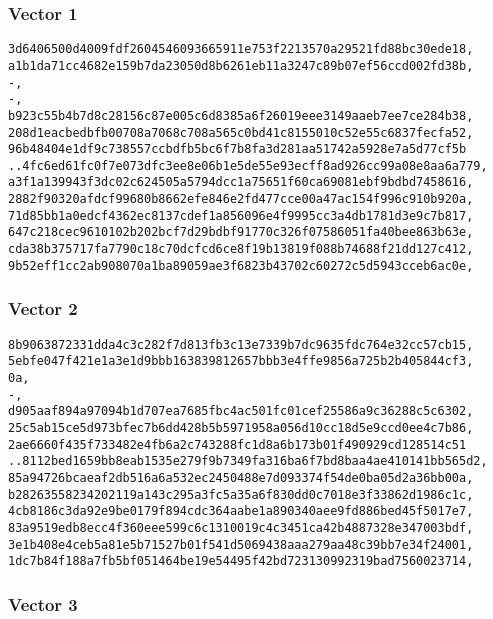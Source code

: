 \documentclass[
]{article}
\begin{document}
\hypertarget{vector-1-1}{%
\subsubsection{Vector 1}\label{vector-1-1}}

\begin{verbatim}
3d6406500d4009fdf2604546093665911e753f2213570a29521fd88bc30ede18,
a1b1da71cc4682e159b7da23050d8b6261eb11a3247c89b07ef56ccd002fd38b,
-,
-,
b923c55b4b7d8c28156c87e005c6d8385a6f26019eee3149aaeb7ee7ce284b38,
208d1eacbedbfb00708a7068c708a565c0bd41c8155010c52e55c6837fecfa52,
96b48404e1df9c738557ccbdfb5bc6f7b8fa3d281aa51742a5928e7a5d77cf5b
..4fc6ed61fc0f7e073dfc3ee8e06b1e5de55e93ecff8ad926cc99a08e8aa6a779,
a3f1a139943f3dc02c624505a5794dcc1a75651f60ca69081ebf9bdbd7458616,
2882f90320afdcf99680b8662efe846e2fd477cce00a47ac154f996c910b920a,
71d85bb1a0edcf4362ec8137cdef1a856096e4f9995cc3a4db1781d3e9c7b817,
647c218cec9610102b202bcf7d29bdbf91770c326f07586051fa40bee863b63e,
cda38b375717fa7790c18c70dcfcd6ce8f19b13819f088b74688f21dd127c412,
9b52eff1cc2ab908070a1ba89059ae3f6823b43702c60272c5d5943cceb6ac0e,
\end{verbatim}

\hypertarget{vector-2-1}{%
\subsubsection{Vector 2}\label{vector-2-1}}

\begin{verbatim}
8b9063872331dda4c3c282f7d813fb3c13e7339b7dc9635fdc764e32cc57cb15,
5ebfe047f421e1a3e1d9bbb163839812657bbb3e4ffe9856a725b2b405844cf3,
0a,
-,
d905aaf894a97094b1d707ea7685fbc4ac501fc01cef25586a9c36288c5c6302,
25c5ab15ce5d973bfec7b6dd428b5b5971958a056d10cc18d5e9ccd0ee4c7b86,
2ae6660f435f733482e4fb6a2c743288fc1d8a6b173b01f490929cd128514c51
..8112bed1659bb8eab1535e279f9b7349fa316ba6f7bd8baa4ae410141bb565d2,
85a94726bcaeaf2db516a6a532ec2450488e7d093374f54de0ba05d2a36bb00a,
b28263558234202119a143c295a3fc5a35a6f830dd0c7018e3f33862d1986c1c,
4cb8186c3da92e9be0179f894cdc364aabe1a890340aee9fd886bed45f5017e7,
83a9519edb8ecc4f360eee599c6c1310019c4c3451ca42b4887328e347003bdf,
3e1b408e4ceb5a81e5b71527b01f541d5069438aaa279aa48c39bb7e34f24001,
1dc7b84f188a7fb5bf051464be19e54495f42bd723130992319bad7560023714,
\end{verbatim}

\hypertarget{vector-3-1}{%
\subsubsection{Vector 3}\label{vector-3-1}}
\end{document}
